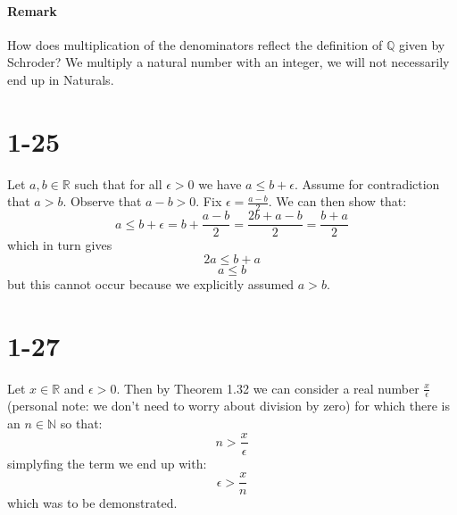 \documentclass{article}
\begin{document}
\paragraph*{Remark} How does multiplication of the denominators reflect the definition of \(\mathbb{Q}\) given by Schroder?
We multiply a natural number with an integer, we will not necessarily end up in Naturals.
\section*{1-25}
Let \(a, b \in \mathbb{R}\) such that for all \(\epsilon > 0\) we have \(a \leq b + \epsilon\). Assume for contradiction
that \(a > b\). Observe that \(a - b > 0\). Fix \(\epsilon = \frac{a - b}{2}\). We can then show that:
\begin{equation*}
    a \leq b + \epsilon = b + \frac{a - b}{2} = \frac{2b + a - b}{2} = \frac{b + a}{2}
\end{equation*}
which in turn gives
\begin{equation*}
    2a \leq b + a
\end{equation*}
\begin{equation*}
    a \leq b 
\end{equation*}
but this cannot occur because we explicitly assumed \(a > b\).
\section*{1-27}
Let \(x \in \mathbb{R}\) and \(\epsilon > 0\). Then by Theorem 1.32 we can consider a real number
\(\frac{x}{\epsilon}\) (personal note: we don't need to worry about division by zero) 
for which there is an \(n \in \mathbb{N}\) so that:
\begin{equation*}
    n > \frac{x}{\epsilon}
\end{equation*} 
simplyfing the term we end up with:
\begin{equation*}
    \epsilon > \frac{x}{n}
\end{equation*}
which was to be demonstrated.
\end{document}
